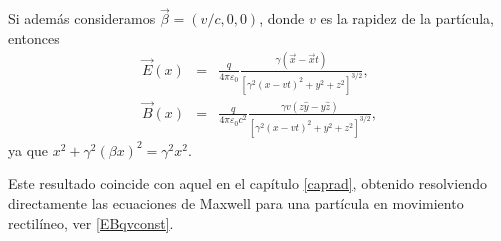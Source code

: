 Si además consideramos $\vec{\beta}=({v}/{c},0,0)$, donde $v$ es
la rapidez de la partícula, entonces
\begin{eqnarray}
\vec{E}(x)&=&\frac{q}{4\pi\varepsilon_0}\frac{\gamma (\vec{x}-\vec{x}t)}{\left[\gamma^2 (x-vt)^2+y^2+z^2\right]^{3/2}} ,
\label{Evx}\\
\vec{B}(x)&=&\frac{q}{4\pi\varepsilon_0c^2}\frac{\gamma v \left(z\hat{y}-y\hat{z}\right)}{\left[\gamma^2 (x-vt)^2+y^2+z^2\right]^{3/2}}, \label{Bvx}
\end{eqnarray}
ya que $ x^2+\gamma^2(\beta x)^2=\gamma^2x^2$.

Este resultado coincide con aquel en el capítulo \ref{caprad}, obtenido resolviendo directamente las ecuaciones de Maxwell para una partícula en movimiento rectilíneo, ver \eqref{EBqvconst}.

%
